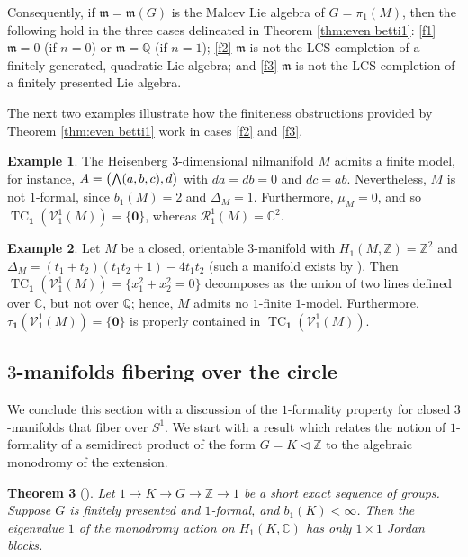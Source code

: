 \documentclass{article}
\numberwithin{equation}{section}
\newtheorem{theorem}{Theorem}[section]
\theoremstyle{definition}
\newtheorem{example}[theorem]{Example}
\newcommand{\Z}{\mathbb{Z}}
\newcommand{\Q}{\mathbb{Q}}
\renewcommand{\C}{\mathbb{C}}
\newcommand{\VV}{\mathcal{V}}
\newcommand{\RR}{\mathcal{R}}
\newcommand{\m}{{\mathfrak{m}}}
\DeclareMathOperator{\TC}{TC}
\newcommand{\one}{\mathbf{1}}
\newcommand{\zero}{\mathbf{0}}
\newcommand{\bwedge}{\mbox{\normalsize $\bigwedge$}}
\begin{document}
Consequently, if $\m=\m(G)$ is the Malcev Lie algebra of $G=\pi_1(M)$, 
then the following hold in the three cases delineated in Theorem \ref{thm:even betti1}:
\ref{f1} $\m=0$ (if $n=0$) or $\m=\Q$ (if $n=1$); 
\ref{f2} $\m$ is not the LCS completion of a finitely generated, quadratic Lie algebra; 
and \ref{f3} $\m$ is not the LCS completion of a finitely presented Lie algebra. 

The next two examples illustrate how the finiteness obstructions provided 
by Theorem \ref{thm:even betti1} work in cases \ref{f2} and \ref{f3}.

\begin{example}
\label{ex:notfm-finite}
The Heisenberg $3$-dimensional nilmanifold $M$ admits a finite model, 
for instance, $A=\big(\bwedge(a,b,c),d\big)$ with $d a=d b=0$ and $d c=ab$. 
Nevertheless, $M$ is not $1$-formal, since $b_1(M)=2$ 
and $\Delta_M=1$. Furthermore, $\mu_M=0$, and so 
$\TC_{\one}(\VV^1_1(M))=\{\zero\}$, whereas $\RR^1_1(M)=\C^2$. 
\end{example}

\begin{example}
\label{ex:finite}
Let $M$ be a closed, orientable $3$-manifold with 
$H_1(M,\Z)=\Z^2$ and $\Delta_M=(t_1+t_2)(t_1t_2+1)-4t_1t_2$ 
(such a manifold exists by \cite[VII.5.3]{Tu}). Then 
$\TC_{\one}(\VV^1_1(M))=\{x_1^2+x_2^2=0\}$ decomposes 
as the union of two lines defined over $\C$, but not over $\Q$; 
hence, $M$ admits no $1$-finite $1$-model. Furthermore, 
$\tau_{\one}(\VV^1_1(M))=\{\zero\}$ is properly contained 
in $\TC_{\one}(\VV^1_1(M))$.  
\end{example}

\subsection{$3$-manifolds fibering over the circle}
\label{subsec:3mfd}
We conclude this section with a discussion of the $1$-formality 
property for closed $3$-manifolds that fiber over $S^1$. 
We start with a result which relates the notion of $1$-formality 
of a semidirect product of the form $G=K\triangleleft \Z$ 
to the algebraic monodromy of the extension.

\begin{theorem}[\cite{PS-forum}]
\label{thm:monoformal}
Let $1\to K\to G\to \Z\to 1$ be a short exact sequence of groups. 
Suppose $G$ is finitely presented and $1$-formal, 
and $b_1(K)<\infty$. Then the 
eigenvalue $1$ of the monodromy action on 
$H_1(K, \C)$ has only $1\times 1$ Jordan blocks.
\end{theorem}
\end{document}
